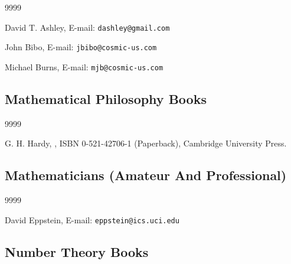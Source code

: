 \begin{thecustombibliography}{9999}

David T. Ashley,
E-mail: \texttt{dashley@gmail.com}

John Bibo,
E-mail: \texttt{jbibo@cosmic-us.com}

Michael Burns,
E-mail: \texttt{mjb@cosmic-us.com}

\end{thecustombibliography}



\subsection*{Mathematical Philosophy Books}

\begin{thecustombibliography}{9999}

G. H. Hardy,
, ISBN 0-521-42706-1 (Paperback),
Cambridge University Press.

\end{thecustombibliography}


\subsection*{Mathematicians (Amateur And Professional)}

\begin{thecustombibliography}{9999}

David Eppstein,
E-mail: \texttt{eppstein@ics.uci.edu}

\end{thecustombibliography}


\subsection*{Number Theory Books}


